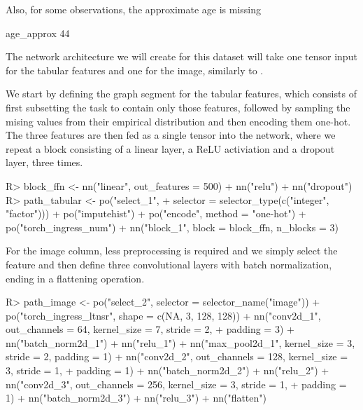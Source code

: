 \documentclass[article]{jss}
\theoremstyle{definition}
\begin{document}
Also, for some observations, the approximate age is missing

\begin{CodeOutput}
age_approx
        44
\end{CodeOutput}


The network architecture we will create for this dataset will take one tensor input for the tabular features and one for the image, similarly to .

We start by defining the graph segment for the tabular features, which consists of first subsetting the task to contain only those features, followed by sampling the mising values from their empirical distribution and then encoding them one-hot.
The three features are then fed as a single tensor into the network, where we repeat a block consisting of a linear layer, a ReLU activiation and a dropout layer, three times.

\begin{CodeInput}
R> block_ffn <- nn("linear", out_features = 500) %
+    nn("relu") %
+    nn("dropout")
R> path_tabular <- po("select_1",
+      selector = selector_type(c("integer", "factor"))) %
+    po("imputehist") %
+    po("encode", method = "one-hot") %
+    po("torch_ingress_num") %
+    nn("block_1", block = block_ffn, n_blocks = 3)
\end{CodeInput}

For the image column, less preprocessing is required and we simply select the feature and then define three convolutional layers with batch normalization, ending in a flattening operation.

\begin{CodeInput}
R> path_image <- po("select_2", selector = selector_name("image")) %
+    po("torch_ingress_ltnsr", shape = c(NA, 3, 128, 128)) %
+    nn("conv2d_1", out_channels = 64, kernel_size = 7, stride = 2,
+      padding = 3) %
+    nn("batch_norm2d_1") %
+    nn("relu_1") %
+    nn("max_pool2d_1", kernel_size = 3, stride = 2, padding = 1) %
+    nn("conv2d_2", out_channels = 128, kernel_size = 3, stride = 1,
+      padding = 1) %
+    nn("batch_norm2d_2") %
+    nn("relu_2") %
+    nn("conv2d_3", out_channels = 256, kernel_size = 3, stride = 1,
+      padding = 1) %
+    nn("batch_norm2d_3") %
+    nn("relu_3") %
+    nn("flatten")
\end{CodeInput}
\end{document}
